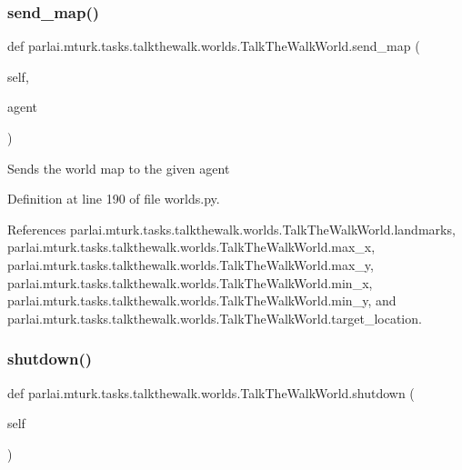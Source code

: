 \subsubsection{\texorpdfstring{send\+\_\+map()}{send\_map()}}
{\footnotesize\ttfamily def parlai.\+mturk.\+tasks.\+talkthewalk.\+worlds.\+Talk\+The\+Walk\+World.\+send\+\_\+map (\begin{DoxyParamCaption}\item[{}]{self,  }\item[{}]{agent }\end{DoxyParamCaption})}

\begin{DoxyVerb}Sends the world map to the given agent\end{DoxyVerb}
 

Definition at line 190 of file worlds.\+py.



References parlai.\+mturk.\+tasks.\+talkthewalk.\+worlds.\+Talk\+The\+Walk\+World.\+landmarks, parlai.\+mturk.\+tasks.\+talkthewalk.\+worlds.\+Talk\+The\+Walk\+World.\+max\+\_\+x, parlai.\+mturk.\+tasks.\+talkthewalk.\+worlds.\+Talk\+The\+Walk\+World.\+max\+\_\+y, parlai.\+mturk.\+tasks.\+talkthewalk.\+worlds.\+Talk\+The\+Walk\+World.\+min\+\_\+x, parlai.\+mturk.\+tasks.\+talkthewalk.\+worlds.\+Talk\+The\+Walk\+World.\+min\+\_\+y, and parlai.\+mturk.\+tasks.\+talkthewalk.\+worlds.\+Talk\+The\+Walk\+World.\+target\+\_\+location.

\mbox{\label{classparlai_1_1mturk_1_1tasks_1_1talkthewalk_1_1worlds_1_1TalkTheWalkWorld_a123c230bcd187f7c8a223ea8d4a02927}} 
\subsubsection{\texorpdfstring{shutdown()}{shutdown()}}
{\footnotesize\ttfamily def parlai.\+mturk.\+tasks.\+talkthewalk.\+worlds.\+Talk\+The\+Walk\+World.\+shutdown (\begin{DoxyParamCaption}\item[{}]{self }\end{DoxyParamCaption})}



